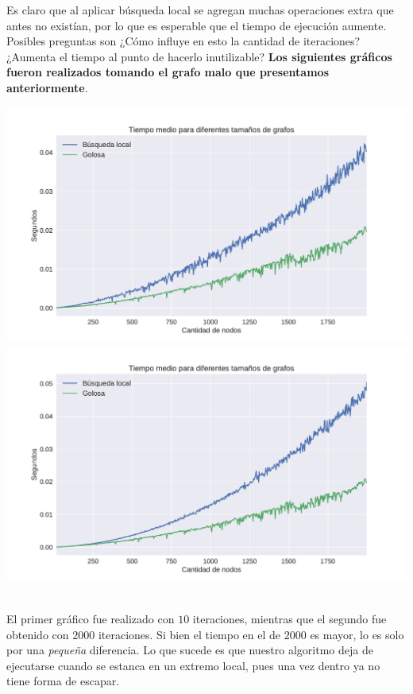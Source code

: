 Es claro que al aplicar búsqueda local se agregan muchas operaciones extra que antes no existían, por lo que es esperable que el tiempo de ejecución aumente. Posibles preguntas son ¿Cómo influye en esto la cantidad de iteraciones? ¿Aumenta el tiempo al punto de hacerlo inutilizable? \textbf{Los siguientes gráficos fueron realizados tomando el grafo malo que presentamos anteriormente}.

{\centering
    \includegraphics[width=1\textwidth]{informe/imgs/exp_malo_tiempo_greedy_local.pdf}
}
{\centering
    \includegraphics[width=1\textwidth]{informe/imgs/exp_malo_tiempo_greedy_local_2000.pdf}
}
$ $\newline

El primer gráfico fue realizado con $10$ iteraciones, mientras que el segundo fue obtenido con $2000$ iteraciones. Si bien el tiempo en el de $2000$ es mayor, lo es solo por una \textit{pequeña} diferencia. Lo que sucede es que nuestro algoritmo deja de ejecutarse cuando se estanca en un extremo local, pues una vez dentro ya no tiene forma de escapar. \\

